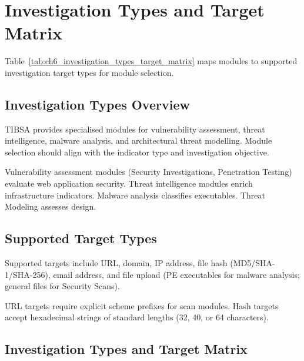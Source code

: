 \section{Investigation Types and Target Matrix}
\label{sec:ch6_investigation_matrix}

Table~\ref{tab:ch6_investigation_types_target_matrix} maps modules to supported investigation target types for module selection.

\subsection{Investigation Types Overview}

TIBSA provides specialised modules for vulnerability assessment, threat intelligence, malware analysis, and architectural threat modelling. Module selection should align with the indicator type and investigation objective.

Vulnerability assessment modules (Security Investigations, Penetration Testing) evaluate web application security. Threat intelligence modules enrich infrastructure indicators. Malware analysis classifies executables. Threat Modeling assesses design.

\subsection{Supported Target Types}

Supported targets include URL, domain, IP address, file hash (MD5/SHA-1/SHA-256), email address, and file upload (PE executables for malware analysis; general files for Security Scans).

URL targets require explicit scheme prefixes for scan modules. Hash targets accept hexadecimal strings of standard lengths (32, 40, or 64 characters).

\subsection{Investigation Types and Target Matrix}

